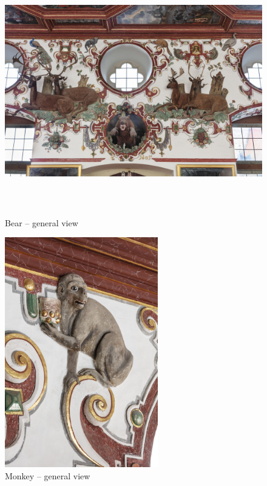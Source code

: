 \documentclass[
  a4paper,
]{book}
\begin{document}
\begin{figure}
\centering

\includegraphics[height=10cm]{images/fmd10005865a.jpg}

\caption{Bear – general view}
\label{fig:{images/fmd10005865a.jpg}}

\clearpage

\centering

\includegraphics[height=10cm]{images/fmd10005867a.jpg}

\caption{Monkey – general view}
\label{fig:{images/fmd10005867a.jpg}}

\clearpage

\centering


\end{figure}
\end{document}
